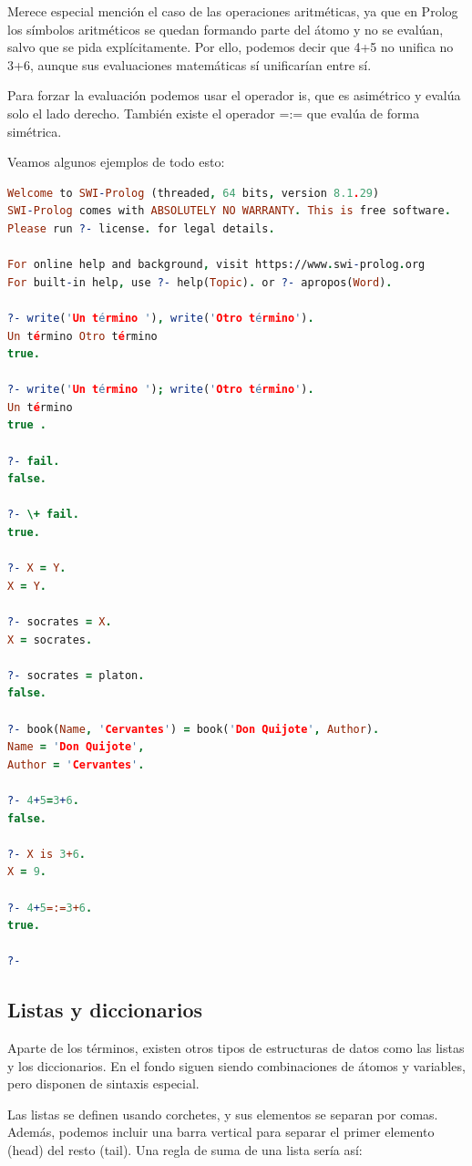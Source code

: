 \documentclass[12pt]{report} %
\begin{document}
Merece especial mención el caso de las operaciones aritméticas, ya que en Prolog los símbolos aritméticos se quedan formando parte del átomo y no se evalúan, salvo que se pida explícitamente. Por ello, podemos decir que 4+5 no unifica no 3+6, aunque sus evaluaciones matemáticas sí unificarían entre sí.

Para forzar la evaluación podemos usar el operador is, que es asimétrico y evalúa solo el lado derecho. También existe el operador =:= que evalúa de forma simétrica.

Veamos algunos ejemplos de todo esto:
\begin{lstlisting}[language=Prolog]
Welcome to SWI-Prolog (threaded, 64 bits, version 8.1.29)
SWI-Prolog comes with ABSOLUTELY NO WARRANTY. This is free software.
Please run ?- license. for legal details.

For online help and background, visit https://www.swi-prolog.org
For built-in help, use ?- help(Topic). or ?- apropos(Word).

?- write('Un término '), write('Otro término').
Un término Otro término
true.

?- write('Un término '); write('Otro término').
Un término 
true .

?- fail.
false.

?- \+ fail.
true.

?- X = Y.
X = Y.

?- socrates = X.
X = socrates.

?- socrates = platon.
false.

?- book(Name, 'Cervantes') = book('Don Quijote', Author).
Name = 'Don Quijote',
Author = 'Cervantes'.

?- 4+5=3+6.
false.

?- X is 3+6.
X = 9.

?- 4+5=:=3+6.
true.

?- 
\end{lstlisting}

\subsection{Listas y diccionarios}

Aparte de los términos, existen otros tipos de estructuras de datos como las listas y los diccionarios. En el fondo siguen siendo combinaciones de átomos y variables, pero disponen de sintaxis especial.

Las listas se definen usando corchetes, y sus elementos se separan por comas. Además, podemos incluir una barra vertical para separar el primer elemento (head) del resto (tail). Una regla de suma de una lista sería así:
\end{document}
